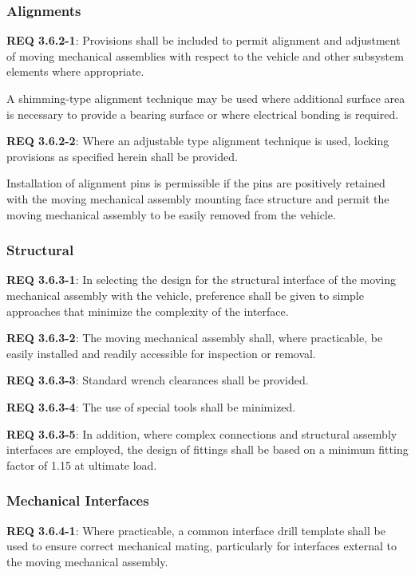 \documentclass[12pt]{article}
\begin{document}
\subsubsection{Alignments} %
\noindent \textbf{REQ 3.6.2-1}: Provisions shall be included to permit alignment and adjustment of moving mechanical assemblies with respect to the vehicle and other subsystem elements where appropriate. 

A shimming-type alignment technique may be used where additional surface area is necessary to provide a bearing surface or where electrical bonding is required. 

\noindent \textbf{REQ 3.6.2-2}: Where an adjustable type alignment technique is used, locking provisions as specified herein shall be provided. 

Installation of alignment pins is permissible if the pins are positively retained with the moving mechanical assembly mounting face structure and permit the moving mechanical assembly to be easily removed from the vehicle.


\subsubsection{Structural} %
\noindent \textbf{REQ 3.6.3-1}: In selecting the design for the structural interface of the moving mechanical assembly with the vehicle, preference shall be given to simple approaches that minimize the complexity of the interface. 

\noindent \textbf{REQ 3.6.3-2}: The moving mechanical assembly shall, where practicable, be easily installed and readily accessible for inspection or removal. 

\noindent \textbf{REQ 3.6.3-3}: Standard wrench clearances shall be provided. 

\noindent \textbf{REQ 3.6.3-4}: The use of special tools shall be minimized. 

\noindent \textbf{REQ 3.6.3-5}: In addition, where complex connections and structural assembly interfaces are employed, the design of fittings shall be based on a minimum fitting factor of 1.15 at ultimate load.


\subsubsection{Mechanical Interfaces} %
\noindent \textbf{REQ 3.6.4-1}: Where practicable, a common interface drill template shall be used to ensure correct mechanical mating, particularly for interfaces external to the moving mechanical assembly.
\end{document}
